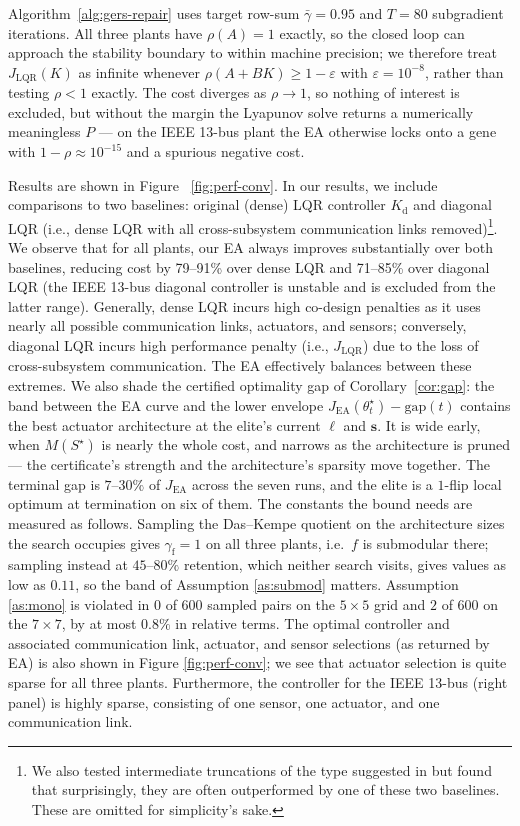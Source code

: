 \documentclass[letterpaper, 10pt, conference]{ieeeconf}
\begin{document}
Algorithm~\ref{alg:gers-repair} uses target row-sum $\bar\gamma = 0.95$ and
$T = 80$ subgradient iterations. All three plants have $\rho(A)=1$ exactly, so
the closed loop can approach the stability boundary to within machine precision;
we therefore treat $J_{\mathrm{LQR}}(K)$ as infinite whenever
$\rho(A+BK) \ge 1-\varepsilon$ with $\varepsilon = 10^{-8}$, rather than testing
$\rho < 1$ exactly. The cost diverges as $\rho \to 1$, so nothing of interest is
excluded, but without the margin the Lyapunov solve returns a numerically
meaningless $P$ --- on the IEEE 13-bus plant the EA otherwise locks onto a gene
with $1-\rho \approx 10^{-15}$ and a spurious negative cost.

Results are shown in Figure ~\ref{fig:perf-conv}. In our results, we include comparisons to two baselines: original (dense) LQR controller $K_\mathrm{d}$ and diagonal LQR (i.e., dense LQR with all cross-subsystem communication links removed)\footnote{We also tested intermediate truncations of the type suggested in \cite{shin} but found that surprisingly, they are often outperformed by one of these two baselines. These are omitted for simplicity's sake.}. We observe that for all plants, our EA always improves substantially over both baselines, reducing cost by 79--91\% over dense LQR
and 71--85\% over diagonal LQR (the IEEE 13-bus diagonal controller is unstable and is excluded from the latter range). Generally, dense LQR incurs high co-design penalties as it uses nearly all possible communication links, actuators, and sensors; conversely, diagonal LQR incurs high performance penalty (i.e., $J_\mathrm{LQR}$) due to the loss of cross-subsystem communication. The EA effectively balances between these extremes. We also shade the certified optimality gap of Corollary~\ref{cor:gap}: the band between the EA curve and the lower envelope $J_\mathrm{EA}(\theta^\star_t) - \mathrm{gap}(t)$ contains the best actuator architecture at the elite's current $\ell$ and $\mathbf{s}$. It is wide early, when $M(S^\star)$ is nearly the whole cost, and narrows as the architecture is pruned --- the certificate's strength and the architecture's sparsity move together. The terminal gap is $7$--$30\%$ of $J_\mathrm{EA}$ across the seven runs, and the elite is a $1$-flip local optimum at termination on six of them. The constants the bound needs are measured as follows. Sampling the Das--Kempe quotient on the architecture sizes the search occupies gives $\gamma_{\mathrm{f}} = 1$ on all three plants, i.e.\ $f$ is submodular there; sampling instead at $45$--$80\%$ retention, which neither search visits, gives values as low as $0.11$, so the band of Assumption \ref{as:submod} matters. Assumption \ref{as:mono} is violated in $0$ of $600$ sampled pairs on the $5\times5$ grid and $2$ of $600$ on the $7\times7$, by at most $0.8\%$ in relative terms. The optimal controller and associated communication link, actuator, and sensor selections (as returned by EA) is also shown in Figure \ref{fig:perf-conv}; we see that actuator selection is quite sparse for all three plants. Furthermore, the controller for the IEEE 13-bus (right panel) is highly sparse, consisting of one sensor, one actuator, and one communication link.
\end{document}

